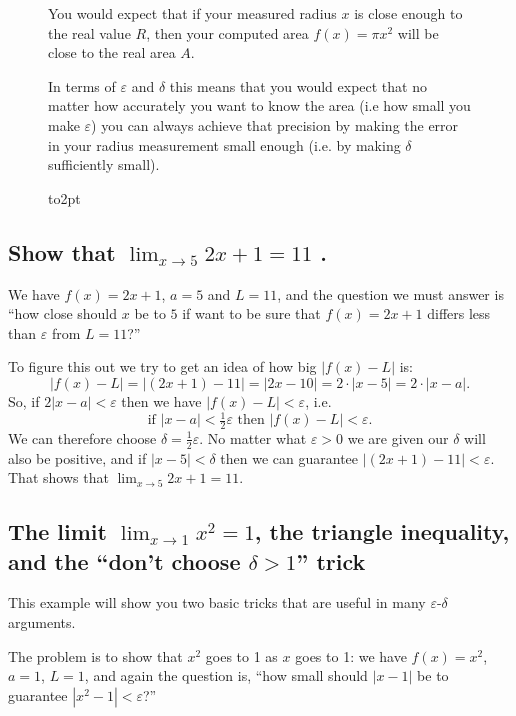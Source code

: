 \begin{figure}[t]
{\begin{minipage}{0.95\textwidth}
\begin{multicols}{2}
      You would expect that if your measured radius $x$ is close enough
      to the real value $R$, then your computed area $f(x) = \pi x^2$
      will be close to the real area $A$.

      In terms of $\varepsilon$ and $\delta$ this means that you would
      expect that no matter how accurately you want to know the area
      (i.e how small you make $\varepsilon$) you can always achieve
      that precision by making the error in your radius measurement
      small enough (i.e.  by making $\delta$ sufficiently small).
    \end{multicols}
    \vbox to2pt{}
  \end{minipage} }
\end{figure}




\subsection{Show that $\lim_{x\to5}2x+1=11$ . }
We have $f(x) = 2x+1$, $a=5$ and $L=11$, and the question we must answer is
``how close should $x$ be to $5$ if want to be sure that $f(x)=2x+1$
differs less than $\varepsilon$ from $L=11$?''

To figure this out we try to get an idea of how big $|f(x)-L|$ is:
\[
|f(x)-L| = \bigl|(2x+1)-11\bigr| = |2x-10| = 2\cdot |x-5| = 2\cdot |x-a|.
\]
So, if $2|x-a|<\varepsilon$ then we have $|f(x)-L|<\varepsilon$, i.e.
\[
\text{if }|x-a|<\tfrac12\varepsilon \text{ then } |f(x)-L|<\varepsilon.
\]
We can therefore choose $\delta = \frac12\varepsilon$.  No matter what
$\varepsilon>0$ we are given our $\delta$ will also be positive, and if
$|x-5|<\delta$ then we can guarantee $|(2x+1) - 11|<\varepsilon$.  That
shows that $\lim_{x\to 5}2x+1 = 11$.




\subsection{The limit $\lim_{x\to 1}x^2 = 1$, the triangle inequality, and the ``don't choose $\delta>1$'' trick}
This example will show you two basic tricks that are useful in many
$\varepsilon$-$\delta$ arguments.

The problem is to show that $x^2$ goes to 1 as $x$ goes to 1: we have $f(x) =
x^2$, $a=1$, $L=1$, and again the question is, ``how small should $|x-1|$ be to
guarantee $|x^2-1|<\varepsilon$?''

